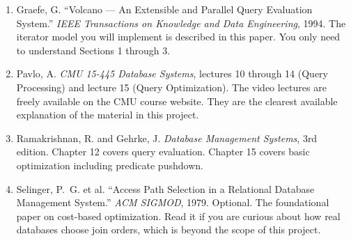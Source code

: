 \documentclass[11pt,a4paper]{article}
\begin{document}
\begin{enumerate} 
\item Graefe, G. ``Volcano --- An Extensible and Parallel Query Evaluation System.'' \textit{IEEE Transactions on Knowledge and Data Engineering}, 1994. The iterator model you will implement is described in this paper. You only need to understand Sections 1 through 3.

\item Pavlo, A. \textit{CMU 15-445 Database Systems}, lectures 10 through 14 (Query Processing) and lecture 15 (Query Optimization). The video lectures are freely available on the CMU course website. They are the clearest available explanation of the material in this project.

\item Ramakrishnan, R. and Gehrke, J. \textit{Database Management Systems}, 3rd edition. Chapter 12 covers query evaluation. Chapter 15 covers basic optimization including predicate pushdown.

\item Selinger, P.~G. et al. ``Access Path Selection in a Relational Database Management System.'' \textit{ACM SIGMOD}, 1979. Optional. The foundational paper on cost-based optimization. Read it if you are curious about how real databases choose join orders, which is beyond the scope of this project.
\end{enumerate}

\footerboxes
\end{document}
